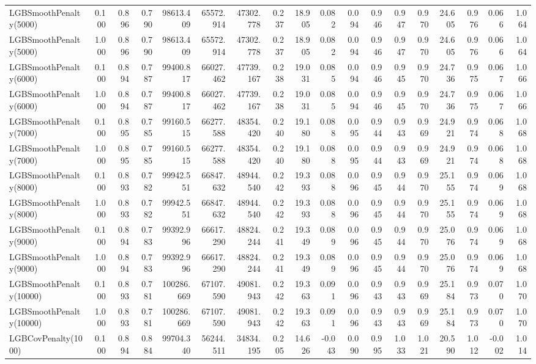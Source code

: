 \documentclass[11pt]{article}
\theoremstyle{plain}
\theoremstyle{definition}
\newcommand{\1}{\mathbf{1}}
\begin{document}
\begin{table}[htbp]
{\begin{tabular}{lrrrrrrrrrrrrrrrrr}
LGBSmoothPenalty(5000) & 0.100 & 0.896 & 0.790 & 98613.409 & 65572.914 & 47302.778 & 0.237 & 18.905 & 0.082 & 0.094 & 0.946 & 0.947 & 0.970 & 24.605 & 0.976 & 0.066 & 1.064 \\
LGBSmoothPenalty(5000) & 1.000 & 0.896 & 0.790 & 98613.409 & 65572.914 & 47302.778 & 0.237 & 18.905 & 0.082 & 0.094 & 0.946 & 0.947 & 0.970 & 24.605 & 0.976 & 0.066 & 1.064 \\
LGBSmoothPenalty(6000) & 0.100 & 0.894 & 0.787 & 99400.817 & 66027.462 & 47739.167 & 0.238 & 19.031 & 0.085 & 0.094 & 0.946 & 0.945 & 0.970 & 24.736 & 0.975 & 0.067 & 1.066 \\
LGBSmoothPenalty(6000) & 1.000 & 0.894 & 0.787 & 99400.817 & 66027.462 & 47739.167 & 0.238 & 19.031 & 0.085 & 0.094 & 0.946 & 0.945 & 0.970 & 24.736 & 0.975 & 0.067 & 1.066 \\
LGBSmoothPenalty(7000) & 0.100 & 0.895 & 0.785 & 99160.515 & 66277.588 & 48354.420 & 0.240 & 19.180 & 0.088 & 0.095 & 0.944 & 0.943 & 0.969 & 24.921 & 0.974 & 0.068 & 1.068 \\
LGBSmoothPenalty(7000) & 1.000 & 0.895 & 0.785 & 99160.515 & 66277.588 & 48354.420 & 0.240 & 19.180 & 0.088 & 0.095 & 0.944 & 0.943 & 0.969 & 24.921 & 0.974 & 0.068 & 1.068 \\
LGBSmoothPenalty(8000) & 0.100 & 0.893 & 0.782 & 99942.551 & 66847.632 & 48944.540 & 0.242 & 19.393 & 0.088 & 0.096 & 0.945 & 0.944 & 0.970 & 25.155 & 0.974 & 0.069 & 1.068 \\
LGBSmoothPenalty(8000) & 1.000 & 0.893 & 0.782 & 99942.551 & 66847.632 & 48944.540 & 0.242 & 19.393 & 0.088 & 0.096 & 0.945 & 0.944 & 0.970 & 25.155 & 0.974 & 0.069 & 1.068 \\
LGBSmoothPenalty(9000) & 0.100 & 0.894 & 0.783 & 99392.996 & 66617.290 & 48824.244 & 0.241 & 19.349 & 0.089 & 0.096 & 0.945 & 0.944 & 0.970 & 25.076 & 0.974 & 0.069 & 1.068 \\
LGBSmoothPenalty(9000) & 1.000 & 0.894 & 0.783 & 99392.996 & 66617.290 & 48824.244 & 0.241 & 19.349 & 0.089 & 0.096 & 0.945 & 0.944 & 0.970 & 25.076 & 0.974 & 0.069 & 1.068 \\
LGBSmoothPenalty(10000) & 0.100 & 0.893 & 0.781 & 100286.669 & 67107.590 & 49081.943 & 0.242 & 19.363 & 0.091 & 0.096 & 0.943 & 0.943 & 0.969 & 25.184 & 0.973 & 0.070 & 1.070 \\
LGBSmoothPenalty(10000) & 1.000 & 0.893 & 0.781 & 100286.669 & 67107.590 & 49081.943 & 0.242 & 19.363 & 0.091 & 0.096 & 0.943 & 0.943 & 0.969 & 25.184 & 0.973 & 0.070 & 1.070 \\
LGBCovPenalty(1000) & 0.100 & 0.894 & 0.884 & 99704.340 & 56244.511 & 34834.195 & 0.205 & 14.626 & -0.043 & 0.090 & 0.995 & 1.033 & 1.021 & 20.590 & 1.012 & -0.002 & 1.014 \\

\end{tabular}}
\end{table}
\end{document}
